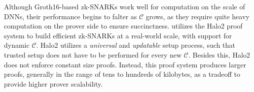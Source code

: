 Although Groth16-based zk-SNARKs work well for computation on the scale of DNNs, their performance begins to falter as $\mathcal{C}$ grows, as they require quite heavy computation on the prover side to ensure succinctness. \sys{} utilizes the Halo2 proof system \cite{halo2_repo} to build efficient zk-SNARKs at a real-world scale, with support for dynamic $\mathcal{C}$. Halo2 utilizes a \textit{universal} and \textit{updatable} setup process, such that trusted setup does not have to be performed for every new $\mathcal{C}$. Besides this, Halo2 does not enforce constant size proofs. Instead, this proof system produces larger proofs, generally in the range of tens to hundreds of kilobytes, as a tradeoff to provide higher prover scalability.
